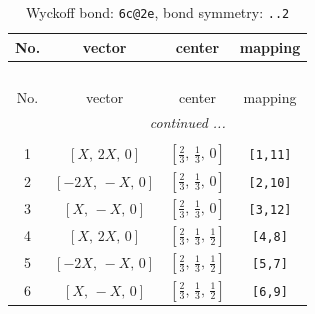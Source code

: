 \documentclass[fleqn,8pt]{jsarticle}
\begin{document}
\renewcommand{\arraystretch}{1.2}
\begin{longtable}{cccc}
\caption{Wyckoff bond: {\tt 6c@2e}, bond symmetry: {\tt ..2}}
 \\
 \hline \hline
No. & vector & center & mapping \\ \hline \endfirsthead

\multicolumn{3}{l}{\tablename\ \thetable{}} \\
 \hline \hline
No. & vector & center & mapping \\ \hline \endhead

 \hline \hline
\multicolumn{3}{r}{\footnotesize\it continued ...} \\ \endfoot

 \hline \hline
\multicolumn{3}{r}{} \\ \endlastfoot

1 & $\left[ X,\, 2 X,\, 0 \right]$ & $\left[ \frac{2}{3},\, \frac{1}{3},\, 0 \right]$ & {\tt [1,11]} \\ \hline
2 & $\left[ - 2 X,\, - X,\, 0 \right]$ & $\left[ \frac{2}{3},\, \frac{1}{3},\, 0 \right]$ & {\tt [2,10]} \\ \hline
3 & $\left[ X,\, - X,\, 0 \right]$ & $\left[ \frac{2}{3},\, \frac{1}{3},\, 0 \right]$ & {\tt [3,12]} \\ \hline
4 & $\left[ X,\, 2 X,\, 0 \right]$ & $\left[ \frac{2}{3},\, \frac{1}{3},\, \frac{1}{2} \right]$ & {\tt [4,8]} \\ \hline
5 & $\left[ - 2 X,\, - X,\, 0 \right]$ & $\left[ \frac{2}{3},\, \frac{1}{3},\, \frac{1}{2} \right]$ & {\tt [5,7]} \\ \hline
6 & $\left[ X,\, - X,\, 0 \right]$ & $\left[ \frac{2}{3},\, \frac{1}{3},\, \frac{1}{2} \right]$ & {\tt [6,9]} \\
\end{longtable}
\renewcommand{\arraystretch}{1.2}
\end{document}
